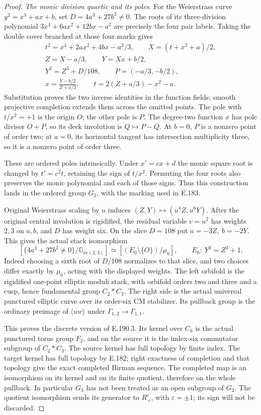 \begin{proof}
\emph{The monic division quartic and its poles.}
For the Weierstrass curve
\(y^2=x^3+ax+b\), set \(D=4a^3+27b^2\ne0\).
The roots of its three-division polynomial
\(3x^4+6ax^2+12bx-a^2\) are precisely the four
pair labels.  Taking the double cover branched at
those four marks gives
\[
 \begin{gathered}
 t^2=x^4+2ax^2+4bx-a^2/3,\qquad
 X=(t+x^2+a)/2,\\
 Z=X-a/3,\qquad Y=Xx+b/2,\\
 Y^2=Z^3+D/108,\qquad P=(-a/3,-b/2),\\
 x=\frac{Y-b/2}{Z+a/3},\qquad
 t=2(Z+a/3)-x^2-a.
 \end{gathered}
\tag{E.190.8}
\]
Substitution proves the two inverse identities in
the function fields; smooth projective completion
extends them across the omitted points.
The pole with \(t/x^2=+1\) is the origin \(O\);
the other pole is \(P\).
The degree-two function \(x\) has pole divisor
\(O+P\), so its deck involution is \(Q\mapsto P-Q\).
At \(b=0\), \(P\) is a nonzero point of order two;
at \(a=0\), its horizontal tangent has intersection
multiplicity three, so it is a nonzero point of
order three.

These are ordered poles intrinsically.  Under
\(x'=cx+d\) the monic square root is changed by
\(t'=c^2t\), retaining the sign of \(t/x^2\).
Permuting the four roots also preserves the monic
polynomial and each of those signs.
Thus this construction lands in the ordered group
\(G_2\), with the marking used in E.183.

Original Weierstrass scaling by \(u\) induces
\((Z,Y)\mapsto(u^4Z,u^6Y)\).  After the original
central involution is rigidified, the residual
variable \(v=u^2\) has weights \(2,3\) on \(a,b\),
and \(D\) has weight six.  On the slice \(D=108\)
put \(a=-3Z,\ b=-2Y\).  This gives the actual
stack isomorphism
\[
 \left[\{4a^3+27b^2\ne0\}/\mathbb G_m{}_{(2,3)}\right]
       \simeq
 \left[(E_0\setminus\{O\})/\mu_6\right],
 \qquad E_0:\ Y^2=Z^3+1 .
\tag{E.190.9}
\]
Indeed choosing a sixth root of \(D/108\) normalizes
to that slice, and two choices differ exactly by
\(\mu_6\), acting with the displayed weights.
The left orbifold is the rigidified one-point
elliptic moduli stack, with orbifold orders two
and three and a cusp, hence fundamental group
\(C_2*C_3\).  The right side is the actual
universal punctured elliptic curve over its
order-six CM stabilizer.  Its pullback group is
the ordinary preimage of \(\langle uw\rangle\)
under \(\Gamma_{1,2}\to\Gamma_{1,1}\).

This proves the discrete version of E.190.3.
Its kernel over \(C_6\) is the actual punctured
torus group \(F_2\), and on the source it is the
index-six commutator subgroup of \(C_2*C_3\).
The source kernel has full topology by finite
index.  The target kernel has full topology by
E.182; right exactness of completion and that
topology give the exact completed Birman
sequence.  The completed map is an isomorphism
on its kernel and on its finite quotient,
therefore on the whole pullback.
In particular \(G_3\) has not been treated as
an open subgroup of \(G_2\).
The quotient isomorphism sends its generator
to \(R_+^\varepsilon\), with
\(\varepsilon=\pm1\); its sign will not be
discarded.


\end{proof}
